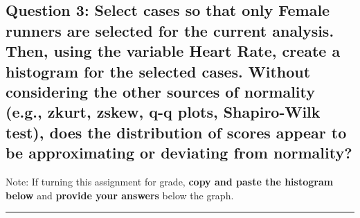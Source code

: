 \documentclass[11pt,]{article}
\begin{document}
\hypertarget{question-3-select-cases-so-that-only-female-runners-are-selected-for-the-current-analysis.-then-using-the-variable-heart-rate-create-a-histogram-for-the-selected-cases.-without-considering-the-other-sources-of-normality-e.g.-zkurt-zskew-q-q-plots-shapiro-wilk-test-does-the-distribution-of-scores-appear-to-be-approximating-or-deviating-from-normality}{%
\subsection{\texorpdfstring{\textbf{Question 3}: Select cases so that
\textbf{only} Female runners are selected for the current analysis.
Then, using the variable \textbf{Heart Rate}, create a histogram for the
selected cases. Without considering the other sources of normality
(e.g., zkurt, zskew, q-q plots, Shapiro-Wilk test), does the
distribution of scores appear to be approximating or deviating from
normality?}{Question 3: Select cases so that only Female runners are selected for the current analysis. Then, using the variable Heart Rate, create a histogram for the selected cases. Without considering the other sources of normality (e.g., zkurt, zskew, q-q plots, Shapiro-Wilk test), does the distribution of scores appear to be approximating or deviating from normality?}}\label{question-3-select-cases-so-that-only-female-runners-are-selected-for-the-current-analysis.-then-using-the-variable-heart-rate-create-a-histogram-for-the-selected-cases.-without-considering-the-other-sources-of-normality-e.g.-zkurt-zskew-q-q-plots-shapiro-wilk-test-does-the-distribution-of-scores-appear-to-be-approximating-or-deviating-from-normality}}

Note: If turning this assignment for grade, \textbf{copy and paste the
histogram below} and \textbf{provide your answers} below the graph.

\begin{center}\rule{0.5\linewidth}{0.5pt}\end{center}
\end{document}
